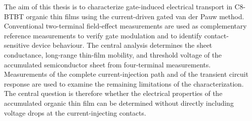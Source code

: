 The aim of this thesis is to characterize gate-induced electrical transport in
C8-BTBT organic thin films using the current-driven gated van der Pauw method.
Conventional two-terminal field-effect measurements are used as complementary
reference measurements to verify gate modulation and to identify
contact-sensitive device behaviour. The central analysis determines the sheet conductance,
long-range thin-film mobility, and threshold voltage of the accumulated
semiconductor sheet from four-terminal measurements. Measurements of the
complete current-injection path and of the transient circuit response are used
to examine the remaining limitations of the characterization. The central
question is therefore whether the electrical properties of the accumulated
organic thin film can be determined without directly including voltage drops at
the current-injecting contacts.